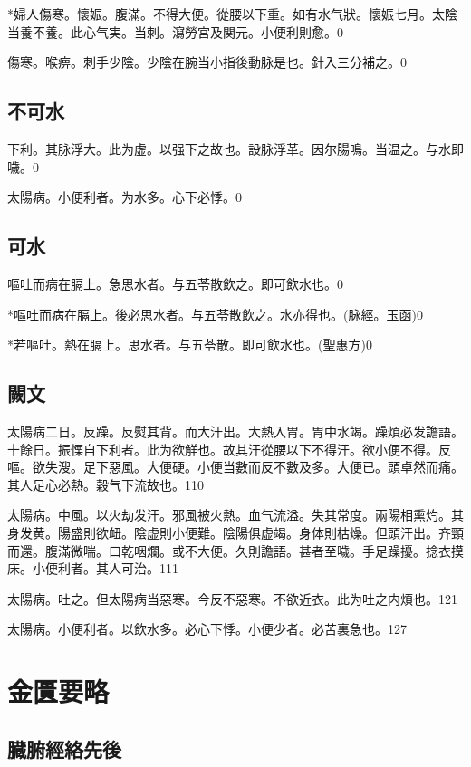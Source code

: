 \documentclass[12pt,oneside,UTF8,b5paper]{ctexbook}她她她她她她她
\begin{document}
*婦人傷寒。懷娠。腹滿。不得大便。從腰以下重。如有水气狀。懷娠七月。太陰当養不養。此心气実。当刺。瀉勞宮及関元。小便利則愈。0

傷寒。喉痹。刺手少陰。少陰在腕当小指後動脉是也。針入三分補之。0

\chapter{不可水}

下利。其脉浮大。此为虚。以强下之故也。設脉浮革。因尔腸鳴。当温之。与水即噦。0

太陽病。小便利者。为水多。心下必悸。0

\chapter{可水}

嘔吐而病在膈上。急思水者。与五苓散飲之。即可飲水也。0

*嘔吐而病在膈上。後必思水者。与五苓散飲之。水亦得也。(脉經。玉函)0

*若嘔吐。熱在膈上。思水者。与五苓散。即可飲水也。(聖惠方)0

\chapter{闕文}

太陽病二日。反躁。反熨其背。而大汗出。大熱入胃。胃中水竭。躁煩必发譫語。十餘日。振慄自下利者。此为欲觧也。故其汗從腰以下不得汗。欲小便不得。反嘔。欲失溲。足下惡風。大便硬。小便当數而反不數及多。大便已。頭卓然而痛。其人足心必熱。穀气下流故也。110

太陽病。中風。以火劫发汗。邪風被火熱。血气流溢。失其常度。兩陽相熏灼。其身发黄。陽盛則欲衄。陰虚則小便難。陰陽俱虚竭。身体則枯燥。但頭汗出。齐頸而還。腹滿微喘。口乾咽爛。或不大便。久則譫語。甚者至噦。手足躁擾。捻衣摸床。小便利者。其人可治。111

太陽病。吐之。但太陽病当惡寒。今反不惡寒。不欲近衣。此为吐之内煩也。121

太陽病。小便利者。以飲水多。必心下悸。小便少者。必苦裏急也。127

\part{金匱要略}

\chapter{臓腑經絡先後}
\end{document}
